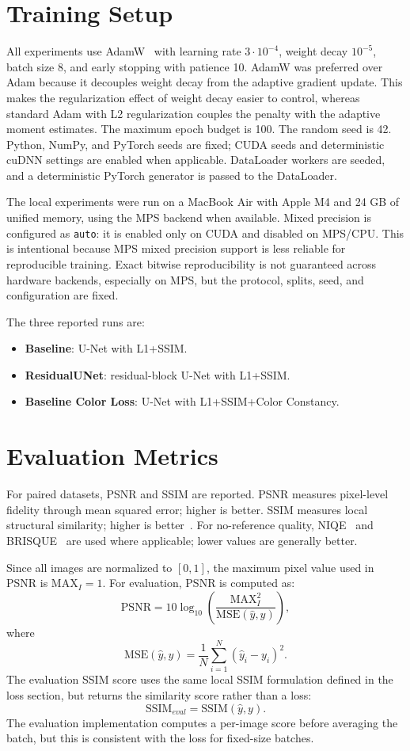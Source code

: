 \documentclass[10pt,twocolumn]{article}
\begin{document}
\section{Training Setup}
All experiments use AdamW~\cite{loshchilov2019adamw} with learning rate $3 \cdot 10^{-4}$, weight decay $10^{-5}$, batch size 8, and early stopping with patience 10. AdamW was preferred over Adam because it decouples weight decay from the adaptive gradient update. This makes the regularization effect of weight decay easier to control, whereas standard Adam with L2 regularization couples the penalty with the adaptive moment estimates. The maximum epoch budget is 100. The random seed is 42. Python, NumPy, and PyTorch seeds are fixed; CUDA seeds and deterministic cuDNN settings are enabled when applicable. DataLoader workers are seeded, and a deterministic PyTorch generator is passed to the DataLoader.

The local experiments were run on a MacBook Air with Apple M4 and 24 GB of unified memory, using the MPS backend when available. Mixed precision is configured as \texttt{auto}: it is enabled only on CUDA and disabled on MPS/CPU. This is intentional because MPS mixed precision support is less reliable for reproducible training. Exact bitwise reproducibility is not guaranteed across hardware backends, especially on MPS, but the protocol, splits, seed, and configuration are fixed.

The three reported runs are:
\begin{itemize}
    \item \textbf{Baseline}: U-Net with L1+SSIM.
    \item \textbf{ResidualUNet}: residual-block U-Net with L1+SSIM.
    \item \textbf{Baseline Color Loss}: U-Net with L1+SSIM+Color Constancy.
\end{itemize}

\section{Evaluation Metrics}
For paired datasets, PSNR and SSIM are reported. PSNR measures pixel-level fidelity through mean squared error; higher is better. SSIM measures local structural similarity; higher is better~\cite{wang2004ssim}. For no-reference quality, NIQE~\cite{mittal2013niqe} and BRISQUE~\cite{mittal2012brisque} are used where applicable; lower values are generally better.

Since all images are normalized to $[0,1]$, the maximum pixel value used in PSNR is $\mathrm{MAX}_I=1$. For evaluation, PSNR is computed as:
\[
\mathrm{PSNR} =
10\log_{10}\left(
\frac{\mathrm{MAX}_I^2}{\mathrm{MSE}(\hat{y},y)}
\right),
\]
where
\[
\mathrm{MSE}(\hat{y},y)=
\frac{1}{N}\sum_{i=1}^{N}(\hat{y}_i-y_i)^2.
\]
The evaluation SSIM score uses the same local SSIM formulation defined in the loss section, but returns the similarity score rather than a loss:
\[
\mathrm{SSIM}_{eval}=\mathrm{SSIM}(\hat{y},y).
\]
The evaluation implementation computes a per-image score before averaging the batch, but this is consistent with the loss for fixed-size batches.
\end{document}
